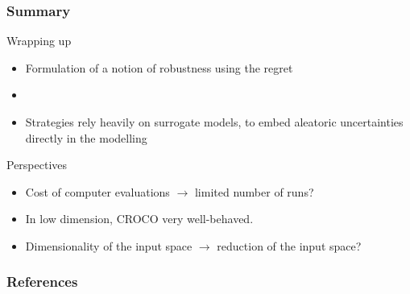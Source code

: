 \documentclass[11pt]{beamer}
\begin{document}
\begin{frame}
\frametitle{Summary}
\begin{block}{Wrapping up}
\begin{itemize}
\item Formulation of a notion of robustness using the regret
\item 
\item Strategies rely heavily on surrogate models, to embed aleatoric
  uncertainties directly in the modelling 
\end{itemize}
\end{block}


\begin{block}{Perspectives}
\begin{itemize}
\item Cost of computer evaluations $\rightarrow$ limited number of runs?
\item In low dimension, CROCO very well-behaved.
\item Dimensionality of the input space $\rightarrow$ reduction of the input space?
\end{itemize}
\end{block}
\end{frame}

\begin{frame}[allowframebreaks]
  \frametitle{References}


\end{frame}


\appendix
\end{document}
